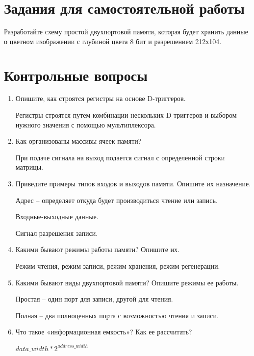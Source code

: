 \documentclass[a4paper,14pt]{article}
\begin{document}
	
	\section{Задания для самостоятельной работы}
	
	Разработайте схему простой двухпортовой памяти, которая будет хранить данные о
	цветном изображении с глубиной цвета 8 бит и разрешением 212х104.
	
			
	\section{Контрольные вопросы}
	
	\begin{enumerate}
		\item Опишите, как строятся регистры на основе D-триггеров.
		
		Регистры строятся путем комбинации нескольких D-триггеров и выбором нужного значения с помощью мультиплексора.
		
		\item Как организованы массивы ячеек памяти?
		
		При подаче сигнала на выход подается сигнал с определенной строки матрицы.
		
		\item Приведите примеры типов входов и выходов памяти. Опишите их назначение.
		
		Адрес -- определяет откуда будет производиться чтение или запись.
		
		Входные-выходные данные.
		
		Сигнал разрешения записи.
		
		\item Какими бывают режимы работы памяти? Опишите их.
		
		Режим чтения, режим записи, режим хранения, режим регенерации.
		
		\item Какими бывают виды двухпортовой памяти? Опишите режимы ее работы.
		
		Простая -- один порт для записи, другой для чтения.
		
		Полная -- два полноценных порта с возможностью чтения и записи.
		
		\item Что такое «информационная емкость»? Как ее рассчитать?
		
		$ data\_width * 2 ^ {address\_width} $
		

\end{enumerate}
\end{document}
